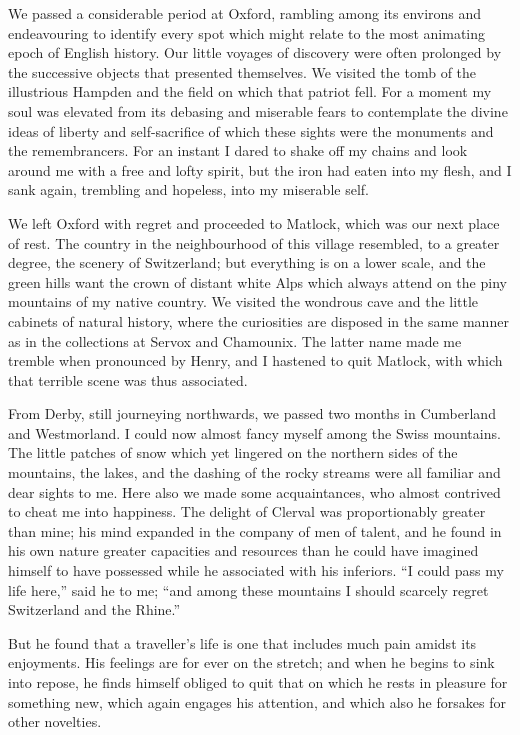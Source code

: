 \documentclass[12pt,openright]{book}
\begin{document}
We passed a considerable period at Oxford, rambling among its environs and endeavouring to identify every spot which might relate to the most animating epoch of English history. Our little voyages of discovery were often prolonged by the successive objects that presented themselves. We visited the tomb of the illustrious Hampden and the field on which that patriot fell. For a moment my soul was elevated from its debasing and miserable fears to contemplate the divine ideas of liberty and self-sacrifice of which these sights were the monuments and the remembrancers. For an instant I dared to shake off my chains and look around me with a free and lofty spirit, but the iron had eaten into my flesh, and I sank again, trembling and hopeless, into my miserable self.

We left Oxford with regret and proceeded to Matlock, which was our next place of rest. The country in the neighbourhood of this village resembled, to a greater degree, the scenery of Switzerland; but everything is on a lower scale, and the green hills want the crown of distant white Alps which always attend on the piny mountains of my native country. We visited the wondrous cave and the little cabinets of natural history, where the curiosities are disposed in the same manner as in the collections at Servox and Chamounix. The latter name made me tremble when pronounced by Henry, and I hastened to quit Matlock, with which that terrible scene was thus associated.

From Derby, still journeying northwards, we passed two months in Cumberland and Westmorland. I could now almost fancy myself among the Swiss mountains. The little patches of snow which yet lingered on the northern sides of the mountains, the lakes, and the dashing of the rocky streams were all familiar and dear sights to me. Here also we made some acquaintances, who almost contrived to cheat me into happiness. The delight of Clerval was proportionably greater than mine; his mind expanded in the company of men of talent, and he found in his own nature greater capacities and resources than he could have imagined himself to have possessed while he associated with his inferiors. “I could pass my life here,” said he to me; “and among these mountains I should scarcely regret Switzerland and the Rhine.”

But he found that a traveller’s life is one that includes much pain amidst its enjoyments. His feelings are for ever on the stretch; and when he begins to sink into repose, he finds himself obliged to quit that on which he rests in pleasure for something new, which again engages his attention, and which also he forsakes for other novelties.
\end{document}
